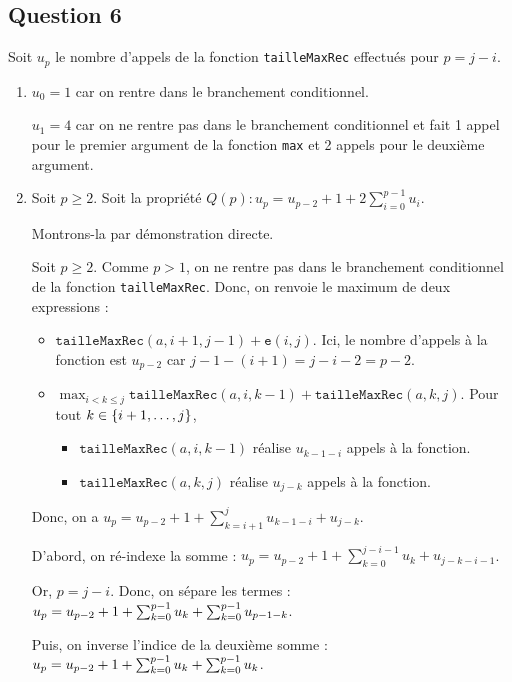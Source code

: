 \documentclass[12pt,a4paper]{article}
\begin{document}
\subsection*{Question 6}
Soit \( u_p \) le nombre d'appels de la fonction \texttt{tailleMaxRec} effectu\'es pour \( p = j-i \).
\begin{enumerate}
	\item \( u_0 = 1 \) car on rentre dans le branchement conditionnel.
	
	\( u_1 = 4 \) car on ne rentre pas dans le branchement conditionnel et fait 1 appel pour le premier argument de la fonction \texttt{max} et 2 appels pour le deuxi\`eme argument.
	\item Soit \( p \geq 2 \). Soit la propri\'et\'e \( Q(p): u_p = u_{p-2} + 1 + 2\sum_{i=0}^{p-1}{u_i} \). 
	
	Montrons-la par d\'emonstration directe.
	
	Soit $p\geq 2$. Comme $p > 1$, on ne rentre pas dans le branchement conditionnel de la fonction \texttt{tailleMaxRec}. Donc, on renvoie le maximum de deux expressions :
	
	\begin{itemize}
		\item $\texttt{tailleMaxRec}(a,i+1,j-1) + \texttt{e}(i,j)$. Ici, le nombre d'appels \`a la fonction est $u_{p-2}$ car $j-1-(i+1)=j-i-2=p-2$.
		\item \( \displaystyle\max_{i < k \leq j} {\texttt{tailleMaxRec}(a,i,k-1)+\texttt{tailleMaxRec}(a,k,j)} \). Pour tout $\\k \in \{i+1, \dotsc, j\}$, 
		\begin{itemize}
			\item $\texttt{tailleMaxRec}(a,i,k-1)$ r\'ealise $u_{k-1-i}$ appels \`a la fonction. 
			\item $\texttt{tailleMaxRec}(a,k,j)$ r\'ealise $u_{j-k}$ appels \`a la fonction.
		\end{itemize}
	\end{itemize}
	Donc, on a $u_p=u_{p-2}+1+\sum_{k=i+1}^{j}{u_{k-1-i}+u_{j-k}}$. 
	
	D'abord, on r\'e-indexe la somme : $u_p=u_{p-2}+1+\sum_{k=0}^{j-i-1}{u_{k}+u_{j-k-i-1}}$. 
	
	Or, $p=j-i$. Donc, on s\'epare les termes : $\\u_p=u_{p-2}+1+\sum_{k=0}^{p-1}{u_{k}}+\sum_{k=0}^{p-1}{u_{p-1-k}}$. 
	
	Puis, on inverse l'indice de la deuxi\`eme somme : $\\u_p=u_{p-2}+1+\sum_{k=0}^{p-1}{u_{k}}+\sum_{k=0}^{p-1}{u_{k}}$. 
	

\end{enumerate}
\end{document}
